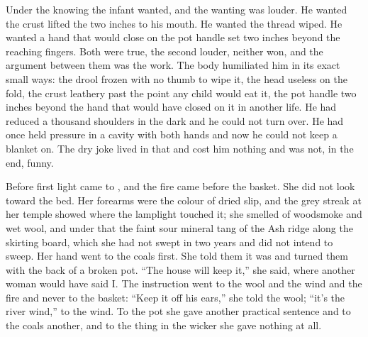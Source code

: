 Under the knowing the infant wanted, and the wanting was louder. He wanted the crust lifted the two inches to his mouth. He wanted the thread wiped. He wanted a hand that would close on the pot handle set two inches beyond the reaching fingers. Both were true, the second louder, neither won, and the argument between them was the work. The body humiliated him in its exact small ways: the drool frozen with no thumb to wipe it, the head useless on the fold, the crust leathery past the point any child would eat it, the pot handle two inches beyond the hand that would have closed on it in another life. He had reduced a thousand shoulders in the dark and he could not turn over. He had once held pressure in a cavity with both hands and now he could not keep a blanket on. The dry joke lived in that and cost him nothing and was not, in the end, funny.

\scenebreak

Before first light  came to , and the fire came before the basket. She did not look toward the bed. Her forearms were the colour of dried slip, and the grey streak at her temple showed where the lamplight touched it; she smelled of woodsmoke and wet wool, and under that the faint sour mineral tang of the Ash ridge along the skirting board, which she had not swept in two years and did not intend to sweep. Her hand went to the coals first. She told them it was  and turned them with the back of a broken pot. “The house will keep it,” she said, where another woman would have said I. The instruction went to the wool and the wind and the fire and never to the basket: “Keep it off his ears,” she told the wool; “it's the river wind,” to the wind. To the pot she gave another practical sentence and to the coals another, and to the thing in the wicker she gave nothing at all.

